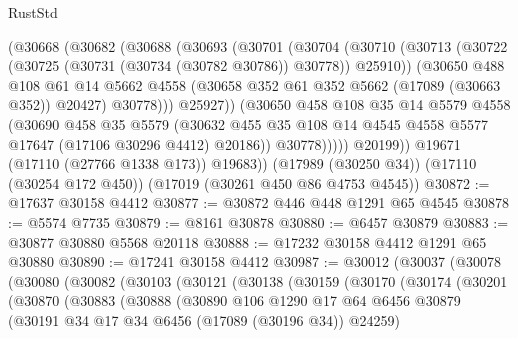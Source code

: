 \begin{lexlean}{RustStd}
\begin{coremodule}
              (@30668
                (@30682
                  (@30688
                    (@30693
                      (@30701
                        (@30704
                          (@30710
                            (@30713
                              (@30722 (@30725 (@30731 (@30734 (@30782 @30786)) @30778)) @25910))
                            (@30650
                              @488
                              @108
                              @61
                              @14
                              @5662
                              @4558
                              (@30658 @352 @61 @352 @5662 (@17089 (@30663 @352)) @20427)
                              @30778)))
                        @25927))
                    (@30650
                      @458
                      @108
                      @35
                      @14
                      @5579
                      @4558
                      (@30690
                        @458
                        @35
                        @5579
                        (@30632
                          @455
                          @35
                          @108
                          @14
                          @4545
                          @4558
                          @5577
                          @17647
                          (@17106 @30296 @4412)
                          @20186))
                      @30778)))))
            @20199))
        @19671
        (@17110 (@27766 @1338 @173))
        @19683))
    (@17989 (@30250 @34))
    (@17110 (@30254 @172 @450))
    (@17019 (@30261 @450 @86 @4753 @4545))
@30872 := @17637 @30158 @4412
@30877 := @30872 @446 @448 @1291 @65 @4545
@30878 := @5574 @7735
@30879 := @8161 @30878
@30880 := @6457 @30879
@30883 := @30877 @30880 @5568 @20118
@30888 := @17232 @30158 @4412 @1291 @65 @30880
@30890 := @17241 @30158 @4412
@30987 := @30012
    (@30037
      (@30078
        (@30080
          (@30082
            (@30103
              (@30121
                (@30138
                  (@30159
                    (@30170
                      (@30174
                        (@30201
                          (@30870
                            (@30883
                              (@30888
                                (@30890
                                  @106
                                  @1290
                                  @17
                                  @64
                                  @6456
                                  @30879
                                  (@30191 @34 @17 @34 @6456 (@17089 (@30196 @34)) @24259)

\end{coremodule}
\end{lexlean}
